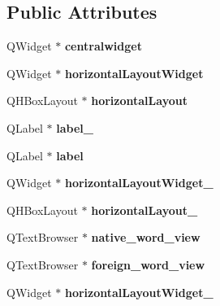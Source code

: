 \subsection*{Public Attributes}
\begin{DoxyCompactItemize}
\item 
\mbox{\label{class_ui___main_win_aa43c905850d7f50a5467788d14cf7fe0}} 
Q\+Widget $\ast$ {\bfseries centralwidget}
\item 
\mbox{\label{class_ui___main_win_adede7cfe504f4e4af09803d68eff5d16}} 
Q\+Widget $\ast$ {\bfseries horizontal\+Layout\+Widget}
\item 
\mbox{\label{class_ui___main_win_a0d62a2b36cb344703803ef3438eba271}} 
Q\+H\+Box\+Layout $\ast$ {\bfseries horizontal\+Layout}
\item 
\mbox{\label{class_ui___main_win_a72e3b25031a3213358c48a1c996f434b}} 
Q\+Label $\ast$ {\bfseries label\+\_}
\item 
\mbox{\label{class_ui___main_win_a9102e1c1bff7a71fe0d255c98c5fa728}} 
Q\+Label $\ast$ {\bfseries label}
\item 
\mbox{\label{class_ui___main_win_abd1ecf6b6dc733a0e1879cc75d991f03}} 
Q\+Widget $\ast$ {\bfseries horizontal\+Layout\+Widget\+\_}
\item 
\mbox{\label{class_ui___main_win_ade0544e4541085a3d7c11ff04a5d08e9}} 
Q\+H\+Box\+Layout $\ast$ {\bfseries horizontal\+Layout\+\_}
\item 
\mbox{\label{class_ui___main_win_aaca3e18af100af24c4da1bbf106b2ec3}} 
Q\+Text\+Browser $\ast$ {\bfseries native\+\_\+word\+\_\+view}
\item 
\mbox{\label{class_ui___main_win_a4af5b27964f7a1fc20dde05c0e7365c6}} 
Q\+Text\+Browser $\ast$ {\bfseries foreign\+\_\+word\+\_\+view}
\item 
\mbox{\label{class_ui___main_win_a901c9888ef08bfd60af50115c32162b7}} 
Q\+Widget $\ast$ {\bfseries horizontal\+Layout\+Widget\+\_}

\end{DoxyCompactItemize}
